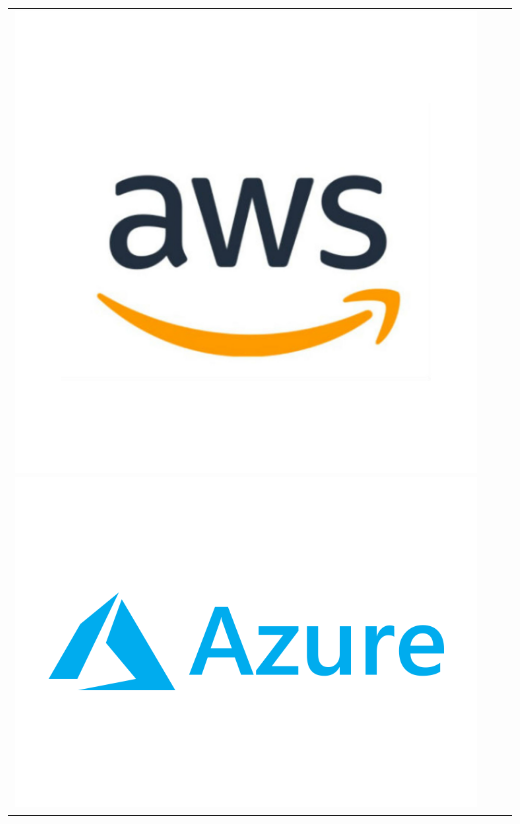 \begin{table}[h]
\centering
\begin{tabular}{ccc}
\includegraphics[scale=0.2]{archivos/aws.png}
\includegraphics[scale=0.2]{archivos/azure.png}

\end{tabular}
\end{table}
